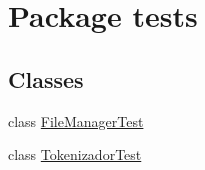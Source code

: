 \hypertarget{namespacetests}{}\section{Package tests}
\label{namespacetests}
\subsection*{Classes}
\begin{DoxyCompactItemize}
\item 
class \hyperlink{classtests_1_1_file_manager_test}{File\+Manager\+Test}
\item 
class \hyperlink{classtests_1_1_tokenizador_test}{Tokenizador\+Test}
\end{DoxyCompactItemize}
